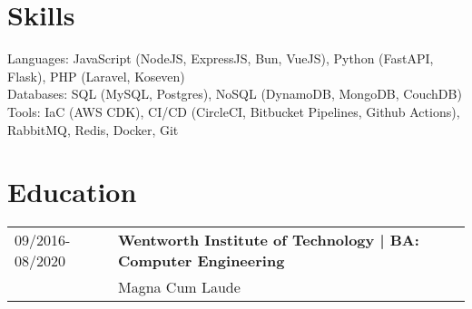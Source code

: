 \documentclass[a4paper,10pt]{article}
\begin{document}
\section*{\textcolor{blueishgray}{Skills}}
Languages: JavaScript (NodeJS, ExpressJS, Bun, VueJS), Python (FastAPI, Flask), PHP (Laravel, Koseven) \\
Databases: SQL (MySQL, Postgres), NoSQL (DynamoDB, MongoDB, CouchDB) \\
Tools: IaC (AWS CDK), CI/CD (CircleCI, Bitbucket Pipelines, Github Actions), RabbitMQ, Redis, Docker, Git

\section*{\textcolor{blueishgray}{Education}}
\begin{tabularx}{\linewidth}{l|>{\raggedright\arraybackslash}X}
    {\small \textcolor{datecolor}{09/2016-08/2020}} & \textbf{\textcolor{blueishgray}{Wentworth Institute of Technology} | BA: Computer Engineering} \\  & Magna Cum Laude
\end{tabularx}
\end{document}
